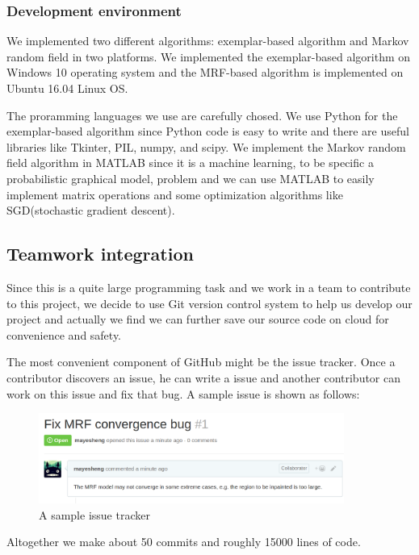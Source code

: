 \subsubsection{Development environment}
We implemented two different algorithms: exemplar-based algorithm and
Markov random field in two platforms. We implemented the exemplar-based
algorithm on Windows 10 operating system and the MRF-based algorithm is
implemented on Ubuntu 16.04 Linux OS.

The proramming languages we use are carefully chosed. We use Python for
the exemplar-based algorithm since Python code is easy to write and there
are useful libraries like Tkinter, PIL, numpy, and scipy. We implement
the Markov random field algorithm in MATLAB since it is a machine learning,
to be specific a probabilistic graphical model, problem and we can use
MATLAB to easily implement matrix operations and some optimization
algorithms like SGD(stochastic gradient descent).
\subsection{Teamwork integration}
Since this is a quite large programming task and we work in a team to
contribute to this project, we decide to use Git version control system
to help us develop our project and actually we find we can further
save our source code on cloud for convenience and safety.

The most convenient component of GitHub might be the issue tracker. Once
a contributor discovers an issue, he can write a issue and another 
contributor can work on this issue and fix that bug. A sample issue is 
shown as follows:
\begin{figure}
    \centering
    \includegraphics[width=10cm]{sc1.png}
    \caption{A sample issue tracker}
\end{figure}
Altogether we make about 50 commits and roughly 15000 lines of code.
